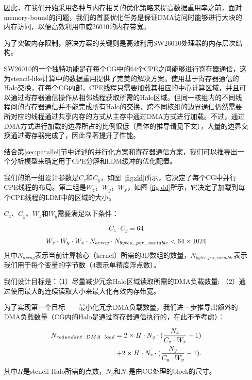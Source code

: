 \documentclass[degree=doctor]{thuthesis}
\begin{document}
因此，在我们开始采用各种与内存相关的优化策略来提高数据重用率之前，面对memory-bound的问题，我们的首要优化任务是保证DMA访问时能够进行大块的内存访问，以便高效利用申威26010的内存带宽。

为了突破内存限制，解决方案的关键则是高效利用SW26010处理器的内存层次结构。

SW26010的一个独特功能是在每个CG中的64个CPE之间能够进行寄存器通信，这为stencil-like计算中的数据重用提供了完美的解决方案。使用基于寄存器通信的Halo交换，在每个CG内部，CPE线程只需要加载其相应的中心计算区域，并且可以通过寄存器通信操作从相邻线程获取所需的Halo区域。但同一核组内的不同线程间的寄存器通信并不能完成所有Halo的交换，跨不同核组的边界通信仍然需要所对应的线程通过共享内存的方式从主存中通过DMA方式进行加载。不过，通过DMA方式进行加载的边界所占的比例很低（具体的推导请见下文），大量的边界交换通过寄存器完成了，因此显著提升了性能。

结合第\ref {sec:parallel}节中详述的并行化方案和寄存器通信方案，我们可以推导出一个分析模型来确定用于CPE分解和LDM缓冲的优化配置。

我们的第一组设计参数是$ C_z $和$ C_y $，如图~\ref{fig:dd}所示，它决定了每个CG中并行CPE线程的布局。第二组是$ W_z $，$ W_y $，$ W_x $，如图 \ref {fig:dd}所示，它决定了加载到每个CPE线程的LDM中的区域的大小。

$C_z$、$C_y$、$W_z$和$W_y$需要满足以下条件：

\begin{equation}
C_z \cdot C_y = 64
\label{eq:czy}
\end{equation}
\begin{equation}
W_z \cdot W_y \cdot W_x \cdot N_{array} \cdot N_{bytes\_per\_variable} < 64 \times 1024\\
\label{eq:wzy}
\end{equation}
其中$ N_{array} $表示当前计算核心（kernel）所需的3D数组的数量，$N_{bytes\_per\_variable}$表示我们用于每个变量的字节数（4表示单精度浮点数）。

我们设计目标是：（1）尽量减少冗余Halo区域读取所需的DMA负载数量; （2）通过使用最大的连续读取大小来最大化有效内存带宽。

为了实现第一个目标——最小化冗余DMA负载数量，我们进一步推导出额外的DMA负载数量（CG内的Halo是通过寄存器通信执行的，在此不予考虑）：

\begin{eqnarray}
N_{redundant\_DMA\_load} = 2 \times H \cdot N_y \cdot (\frac{N_z}{C_z\cdot W_z}-1) \notag \\
+ 2 \times H \cdot N_z \cdot (\frac{N_y}{C_y\cdot W_y}-1).
\label{eq:load}
\end{eqnarray}
其中$ H $是stencil Halo所需的点数，$ N_y $和$ N_z $是由CG处理的block的尺寸。
\end{document}
